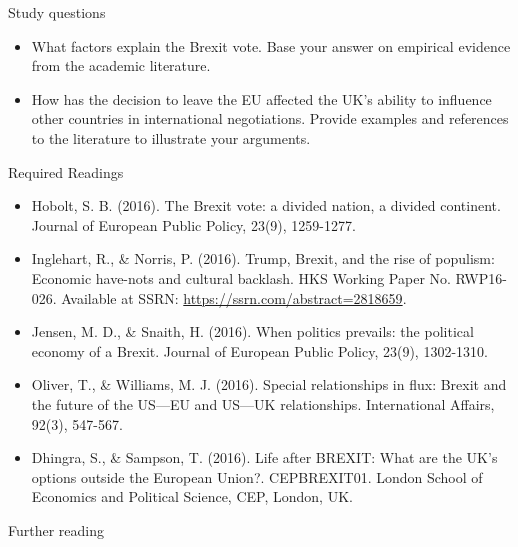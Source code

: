 Study questions

\begin{itemize}
	\item What factors explain the Brexit vote. Base your answer on empirical evidence from the academic literature.
	\item How has the decision to leave the EU affected the UK's ability to influence other countries in international negotiations. Provide examples and references to the literature to illustrate your arguments.
\end{itemize}

\noindent Required Readings

\begin{itemize}
	\item Hobolt, S. B. (2016). The Brexit vote: a divided nation, a divided continent. Journal of European Public Policy, 23(9), 1259-1277.
	\item Inglehart, R., \& Norris, P. (2016). Trump, Brexit, and the rise of populism: Economic have-nots and cultural backlash. HKS Working Paper No. RWP16-026. Available at SSRN: \url{https://ssrn.com/abstract=2818659}.
	\item Jensen, M. D., \& Snaith, H. (2016). When politics prevails: the political economy of a Brexit. Journal of European Public Policy, 23(9), 1302-1310.
	\item Oliver, T., \& Williams, M. J. (2016). Special relationships in flux: Brexit and the future of the US—EU and US—UK relationships. International Affairs, 92(3), 547-567.
	\item Dhingra, S., \& Sampson, T. (2016). Life after BREXIT: What are the UK’s options outside the European Union?. CEPBREXIT01. London School of Economics and Political Science, CEP, London, UK.
\end{itemize}

\noindent Further reading

